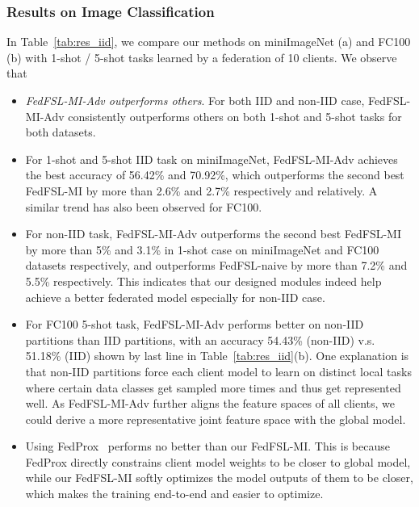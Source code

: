 \subsubsection{Results on Image Classification}
In Table~\ref{tab:res_iid}, we compare our methods on miniImageNet (a) and FC100 (b) with 1-shot / 5-shot tasks learned by a federation of 10 clients. 
We observe that
\begin{itemize}[leftmargin=*]
\item \emph{FedFSL-MI-Adv outperforms others}. For both IID and non-IID case, FedFSL-MI-Adv consistently outperforms others on both 1-shot and 5-shot tasks for both datasets. 
\item For 1-shot and 5-shot IID task on miniImageNet, FedFSL-MI-Adv achieves the best accuracy of 56.42\% and 70.92\%, which outperforms the second best FedFSL-MI by more than 2.6\% and 2.7\% respectively and relatively. A similar trend has also been observed for FC100.
\item For non-IID task, FedFSL-MI-Adv outperforms the second best FedFSL-MI by more than 5\% and 3.1\% in 1-shot case on miniImageNet and FC100 datasets respectively, and outperforms FedFSL-naive by more than 7.2\% and 5.5\% respectively. This indicates that our designed modules indeed help achieve a better federated model especially for non-IID case.
\item For FC100 5-shot task,  FedFSL-MI-Adv performs better on non-IID partitions than IID partitions, with an accuracy 54.43\% (non-IID) v.s. 51.18\% (IID) shown by last line in Table~\ref{tab:res_iid}(b). One explanation is that non-IID partitions force each client model to learn on distinct local tasks where certain data classes get sampled more times and thus get represented well. As FedFSL-MI-Adv further aligns the feature spaces of all clients, we could derive a more representative joint feature space with the global model.
\item Using FedProx~\cite{li2018federated} performs no better than our FedFSL-MI. This is because FedProx directly constrains client model weights to be closer to global model, while our FedFSL-MI softly optimizes the model outputs of them to be closer, which makes the training end-to-end and easier to optimize.



\end{itemize}
